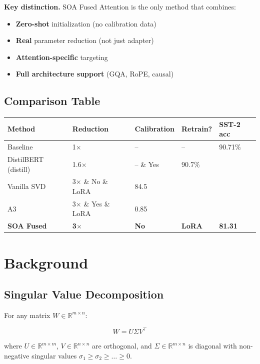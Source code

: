 \textbf{Key distinction.} SOA Fused Attention is the only method that combines:
\begin{itemize}
\item \textbf{Zero-shot} initialization (no calibration data)
\item \textbf{Real} parameter reduction (not just adapter)
\item \textbf{Attention-specific} targeting
\item \textbf{Full architecture support} (GQA, RoPE, causal)

\end{itemize}


\subsection{Comparison Table}

\begin{table}[H]
\centering
\small
\begin{tabular}{lllll}
\toprule
\textbf{Method} & \textbf{Reduction} & \textbf{Calibration} & \textbf{Retrain?} & \textbf{SST-2 acc} \\
\midrule
Baseline & 1$\times$ & -- & -- & 90.71\% \\
DistilBERT (distill) & 1.6$\times$ & -- \& Yes & 90.7\% \\
Vanilla SVD & 3$\times$ \& No \& LoRA & 84.5 \\
A3 & 3$\times$ \& Yes \& LoRA & 0.85 \\
\textbf{SOA Fused} & \textbf{3$\times$} & \textbf{No} & \textbf{LoRA} & \textbf{81.31} \\
\bottomrule
\end{tabular}
\end{table}



\section{Background}

\subsection{Singular Value Decomposition}

For any matrix $W \in \mathbb{R}^{m \times n}$:

\[
W = U \Sigma V^\top
\]

where $U \in \mathbb{R}^{m \times m}$, $V \in \mathbb{R}^{n \times n}$ are 
orthogonal, and $\Sigma \in \mathbb{R}^{m \times n}$ is diagonal with 
non-negative singular values $\sigma_1 \geq \sigma_2 \geq \dots \geq 0$.

